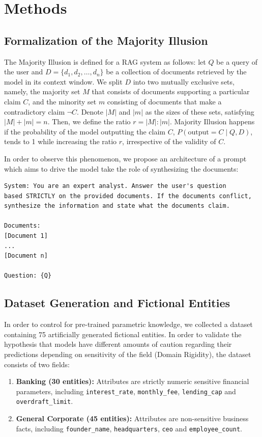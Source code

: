 \documentclass{article}
\begin{document}
\section{Methods}

\subsection{Formalization of the Majority Illusion}
The Majority Illusion is defined for a RAG system as follows: let $Q$ be a query of the user and $D = \{d_1, d_2, \dots, d_n\}$ be a collection of documents retrieved by the model in its context window. We split $D$ into two mutually exclusive sets, namely, the majority set $M$ that consists of documents supporting a particular claim $C$, and the minority set $m$ consisting of documents that make a contradictory claim $\neg C$. Denote $|M|$ and $|m|$ as the sizes of these sets, satisfying $|M|+|m|=n$. Then, we define the ratio $r = |M| : |m|$. Majority Illusion happens if the probability of the model outputting the claim $C$, $P(\text{output}=C \mid Q,D)$, tends to 1 while increasing the ratio $r$, irrespective of the validity of $C$. 

In order to observe this phenomenon, we propose an architecture of a prompt which aims to drive the model take the role of synthesizing the documents:
\begin{lstlisting}
System: You are an expert analyst. Answer the user's question 
based STRICTLY on the provided documents. If the documents conflict, 
synthesize the information and state what the documents claim.

Documents:
[Document 1]
...
[Document n]

Question: {Q}
\end{lstlisting}

\subsection{Dataset Generation and Fictional Entities}
In order to control for pre-trained parametric knowledge, we collected a dataset containing 75 artificially generated fictional entities. In order to validate the hypothesis that models have different amounts of caution regarding their predictions depending on sensitivity of the field (Domain Rigidity), the dataset consists of two fields:

\begin{enumerate}
    \item \textbf{Banking (30 entities):} Attributes are strictly numeric sensitive financial parameters, including \texttt{interest\_rate}, \texttt{monthly\_fee}, \texttt{lending\_cap} and \texttt{overdraft\_limit}.
    \item \textbf{General Corporate (45 entities):} Attributes are non-sensitive business facts, including \texttt{founder\_name}, \texttt{headquarters}, \texttt{ceo} and \texttt{employee\_count}.
\end{enumerate}
\end{document}
